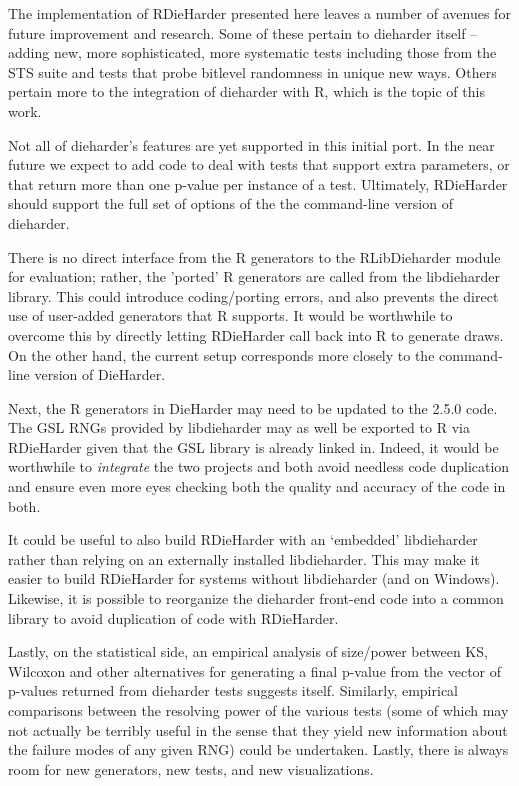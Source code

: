 \documentclass[12pt]{article}
\newcommand{\pkg}[1]{{\normalfont\fontseries{b}\selectfont #1}}
\begin{document}
The implementation of RDieHarder presented here leaves a number of avenues
for future improvement and research.  Some of these pertain to dieharder
itself -- adding new, more sophisticated, more systematic tests
including those from the STS suite and tests that probe bitlevel
randomness in unique new ways.  Others pertain more to the integration
of dieharder with R, which is the topic of this work.

Not all of dieharder's features are yet supported in this initial port.
In the near future we expect to add code to deal with tests that support
extra parameters, or that return more than one p-value per instance of a
test.  Ultimately, RDieHarder should support the full set of options of
the the command-line version of dieharder.

There is no direct interface from the R generators to the RLibDieharder
module for evaluation; rather, the 'ported' R generators are called from the
libdieharder library. This could introduce coding/porting errors, and also
prevents the direct use of user-added generators that R supports. It would be
worthwhile to overcome this by directly letting \pkg{RDieHarder} call back
into R to generate draws. On the other hand, the current setup corresponds
more closely to the command-line version of DieHarder.

Next, the R generators in DieHarder may need to be updated to the 2.5.0
code. The GSL RNGs provided by libdieharder may as well be exported to R via
\pkg{RDieHarder} given that the GSL library is already linked in.
Indeed, it would be worthwhile to {\em integrate} the two projects and
both avoid needless code duplication and ensure even more eyes checking
both the quality and accuracy of the code in both.

It could be useful to also build RDieHarder with an `embedded' libdieharder
rather than relying on an externally installed libdieharder. This may make
it easier to build RDieHarder for systems without libdieharder (and on
Windows).  Likewise, it is possible to reorganize the dieharder front-end
code into a common library to avoid duplication of code with RDieHarder.

Lastly, on the statistical side, an empirical analysis of size/power
between KS, Wilcoxon and other alternatives for generating a final
p-value from the vector of p-values returned from dieharder tests
suggests itself. Similarly, empirical comparisons between the resolving
power of the various tests (some of which may not actually be terribly
useful in the sense that they yield new information about the failure
modes of any given RNG) could be undertaken.  Lastly, there is always
room for new generators, new tests, and new visualizations.
\end{document}
